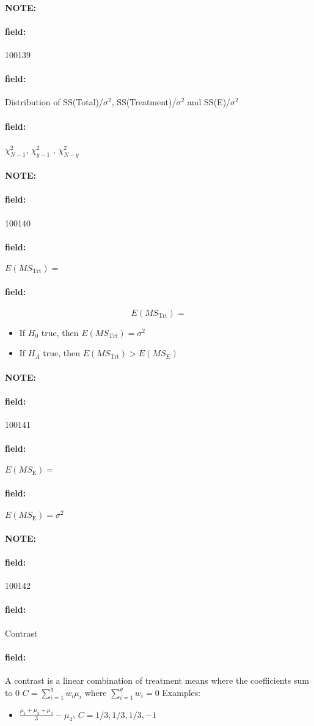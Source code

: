 \documentclass[12pt]{article}
\newenvironment{note}{\paragraph{NOTE:}}{}
\newenvironment{field}{\paragraph{field:}}{}
\begin{document}
\begin{note}
    \begin{field}
        \tiny 100139
    \end{field}
    \begin{field}
        Distribution of SS(Total)/$\sigma^2$, SS(Treatment)/$\sigma^2$ and SS(E)/$\sigma^2$
    \end{field}
    \begin{field}
        $\chi^2_{N-1}$, $\chi^2_{g-1}$ , $\chi^2_{N-g}$
    \end{field}
\end{note}

\begin{note}
    \begin{field}
        \tiny 100140
    \end{field}
    \begin{field}
        $E(MS_{\text{Trt}}) = $
    \end{field}
    \begin{field}
        $$E(MS_{\text{Trt}}) = $$
        \begin{itemize}
          \item If $H_0$ true, then $E(MS_{\text{Trt}}) = \sigma^2$
          \item If $H_A$ true, then $E(MS_{\text{Trt}})> E(MS_E)$
        \end{itemize}
    \end{field}
\end{note}

\begin{note}
    \begin{field}
        \tiny 100141
    \end{field}
    \begin{field}
        $E(MS_{\text{E}}) = $
    \end{field}
    \begin{field}
        $E(MS_{\text{E}}) = \sigma^2$
    \end{field}
\end{note}

\begin{note}
    \begin{field}
        \tiny 100142
    \end{field}
    \begin{field}
        Contrast
    \end{field}
    \begin{field}
        A contrast is a linear combination of treatment means where the coefficients sum to 0
        $C = \sum_{i=1}^g w_i \mu_i$ where $\sum_{i=1}^g w_i = 0$
        Examples:
        \begin{itemize}
          \item $\frac{\mu_1+\mu_2 +\mu_3 }{3} - \mu_4$, $C = 1/3,1/3,1/3,-1$
        \end{itemize}
    \end{field}
\end{note}
\end{document}
